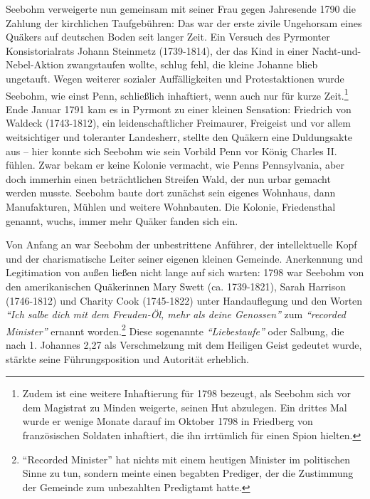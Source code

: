 \medskip

Seebohm verweigerte nun gemeinsam mit seiner Frau gegen Jahresende 1790 die
Zahlung der kirchlichen Taufgebühren: Das war der erste
zivile Ungehorsam eines Quäkers auf deutschen Boden
seit langer Zeit. Ein Versuch des Pyrmonter Konsistorialrats Johann
Steinmetz (1739-1814), der das Kind in einer
Nacht-und-Nebel-Aktion zwangstaufen wollte, schlug fehl, die kleine
Johanne blieb ungetauft. Wegen weiterer
sozialer Auffälligkeiten und Protestaktionen wurde
Seebohm, wie einst Penn, schließlich
inhaftiert, wenn auch nur für kurze
Zeit.\footnote{Zudem ist eine weitere Inhaftierung für 1798 bezeugt, als Seebohm
sich vor
dem Magistrat zu Minden weigerte, seinen Hut abzulegen. Ein drittes Mal wurde er
wenige Monate darauf im Oktober 1798 in Friedberg von französischen Soldaten
inhaftiert, die ihn irrtümlich für einen Spion hielten.} Ende Januar 1791 kam es
in Pyrmont zu einer kleinen Sensation: Friedrich von
Waldeck (1743-1812), ein
leidenschaftlicher Freimaurer, Freigeist und vor
allem weitsichtiger und toleranter Landesherr, stellte den Quäkern eine
Duldungsakte aus -- hier konnte sich Seebohm wie sein
Vorbild Penn vor König Charles II. fühlen. 
Zwar bekam er keine Kolonie vermacht, wie Penns Pennsylvania, aber doch
immerhin einen beträchtlichen Streifen Wald, der nun urbar gemacht werden
musste. Seebohm baute dort zunächst sein eigenes Wohnhaus, dann Manufakturen,
Mühlen und weitere Wohnbauten. Die Kolonie,
Friedensthal genannt, wuchs, immer mehr Quäker fanden
sich ein.

\medskip

Von Anfang an war Seebohm der unbestrittene Anführer, der intellektuelle Kopf
und der charismatische Leiter seiner eigenen kleinen Gemeinde. Anerkennung und
Legitimation von außen ließen nicht lange auf sich warten: 1798 war Seebohm von
den amerikanischen Quäkerinnen Mary Swett (ca.
1739-1821), Sarah Harrison (1746-1812) und Charity Cook (1745-1822) unter Handauflegung und den Worten \textit{"`Ich salbe dich mit dem
Freuden-Öl, mehr als deine Genossen"'} zum \textit{"`recorded Minister"'} ernannt worden.\footnote{"`Recorded Minister"' hat nichts mit einem
heutigen Minister im politischen
Sinne zu tun, sondern meinte einen begabten Prediger, der die Zustimmung der
Gemeinde zum unbezahlten Predigtamt hatte.} Diese sogenannte
\textit{"`Liebestaufe"'} oder Salbung, die nach
1. Johannes 2,27 als Verschmelzung mit dem Heiligen Geist
gedeutet wurde, stärkte seine Führungsposition und Autorität erheblich.

